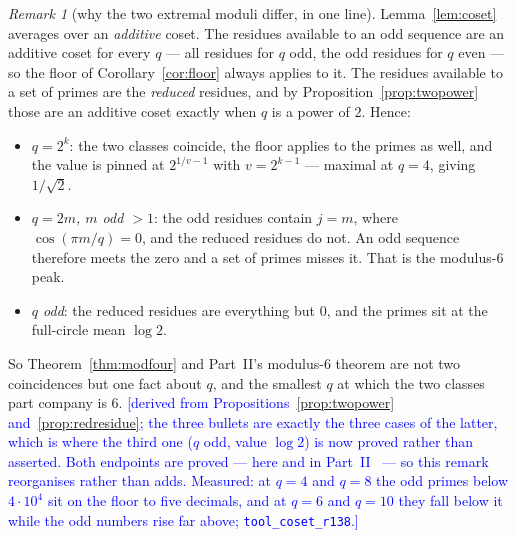 \documentclass[11pt,a4paper]{article}
\theoremstyle{plain}
\theoremstyle{definition}
\theoremstyle{remark}
\newtheorem{remark}[theorem]{Remark}
\newcommand{\STATUS}[1]{\textcolor{blue}{\textsf{[#1]}}}
\begin{document}
\begin{remark}[why the two extremal moduli differ, in one line]\label{rem:whytwo}
Lemma~\ref{lem:coset} averages over an \emph{additive} coset. The residues available to an odd
sequence are an additive coset for every $q$ --- all residues for $q$ odd, the odd residues for
$q$ even --- so the floor of Corollary~\ref{cor:floor} always applies to it. The residues
available to a set of primes are the \emph{reduced} residues, and by
Proposition~\ref{prop:twopower} those are an additive coset exactly when $q$ is a power of $2$.
Hence:
\begin{itemize}
\item \emph{$q=2^{k}$}: the two classes coincide, the floor applies to the primes as well, and
      the value is pinned at $2^{1/v-1}$ with $v=2^{k-1}$ --- maximal at $q=4$, giving
      $1/\sqrt2$.
\item \emph{$q=2m$, $m$ odd $>1$}: the odd residues contain $j=m$, where $\cos(\pi m/q)=0$, and
      the reduced residues do not. An odd sequence therefore meets the zero and a set of primes
      misses it. That is the modulus-$6$ peak.
\item \emph{$q$ odd}: the reduced residues are everything but $0$, and the primes sit at the
      full-circle mean $\log2$.
\end{itemize}
So Theorem~\ref{thm:modfour} and Part~II's modulus-$6$ theorem are not two coincidences but one
fact about $q$, and the smallest $q$ at which the two classes part company is $6$.
\STATUS{derived from Propositions~\ref{prop:twopower} and~\ref{prop:redresidue}; the three
bullets are exactly the three cases of the latter, which is where the third one ($q$ odd, value
$\log2$) is now proved rather than asserted. Both endpoints are proved --- here and in
Part~II~\cite{P2} --- so this remark reorganises rather than adds. Measured: at $q=4$ and $q=8$
the odd primes below $4\cdot10^{4}$ sit on the floor to five decimals, and at $q=6$ and $q=10$
they fall below it while the odd numbers rise far above; \texttt{tool\_coset\_r138}.}
\end{remark}
\end{document}
